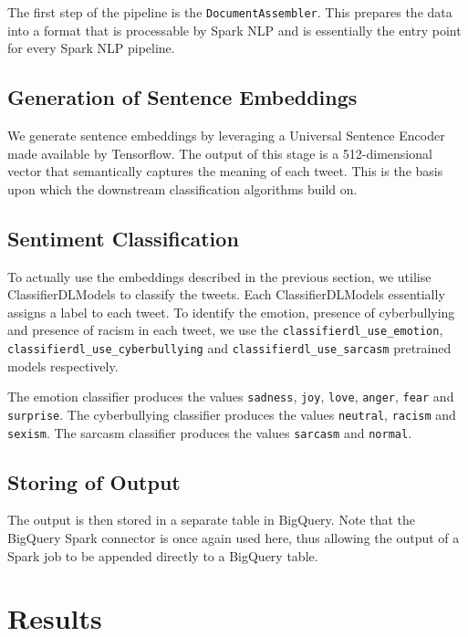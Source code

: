 \documentclass[a4paper,12pt]{article}
\begin{document}
The first step of the pipeline is the \texttt{DocumentAssembler}\cite{DocumentAssembler}. This prepares the data into
a format that is processable by Spark NLP and is essentially the entry point for every Spark NLP pipeline.

\subsection{Generation of Sentence Embeddings}
\label{sec:sentence-embeddings}

We generate sentence embeddings by leveraging a Universal Sentence Encoder\cite{semanticSimilarity} made available by
Tensorflow. The output of this stage is a 512-dimensional vector that semantically captures the meaning of each tweet.
This is the basis upon which the downstream classification algorithms build on.

\subsection{Sentiment Classification}
To actually use the embeddings described in the previous section, we utilise ClassifierDLModels\cite{ClassifierDLModel}
to classify the tweets. Each ClassifierDLModels essentially assigns a label to each tweet. To identify the emotion,
presence of cyberbullying and presence of racism in each tweet, we use the \texttt{classifierdl\_use\_emotion},
\texttt{classifierdl\_use\_cyberbullying} and \texttt{classifierdl\_use\_sarcasm} pretrained models respectively.

The emotion classifier produces the values \texttt{sadness}, \texttt{joy}, \texttt{love}, \texttt{anger},
\texttt{fear} and \texttt{surprise}. The cyberbullying classifier produces the values \texttt{neutral},
\texttt{racism} and \texttt{sexism}. The sarcasm classifier produces the values \texttt{sarcasm} and \texttt{normal}.

\subsection{Storing of Output}
The output is then stored in a separate table in BigQuery. Note that the BigQuery Spark connector is once again used here, thus allowing the output of a Spark job to be appended directly to a BigQuery table.

\section{Results}
\end{document}
